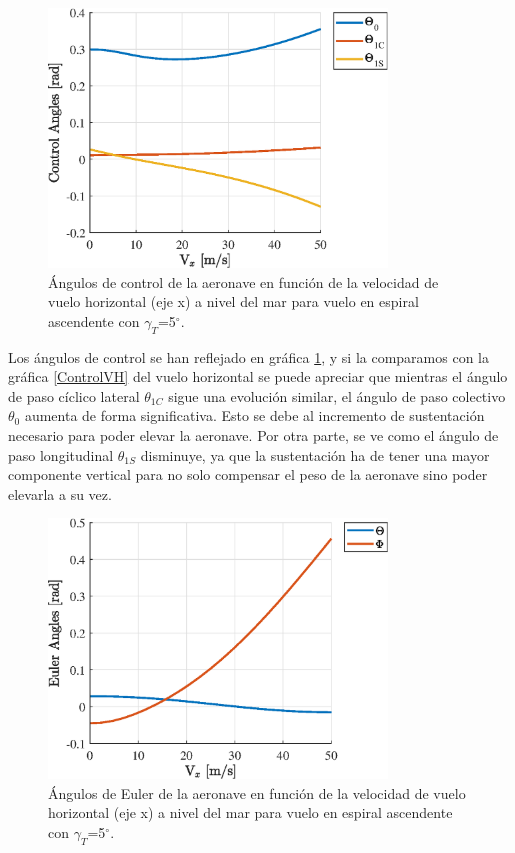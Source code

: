 \begin{figure}
	\centering
	\includegraphics[width=90mm]{graficos/ControlVE}
	\caption{Ángulos de control de la aeronave en función de la velocidad de vuelo horizontal (eje x) a nivel del mar para vuelo en espiral ascendente con $\gamma_T$=5$^\circ$.}
	\label{ControlVE}
\end{figure}

Los ángulos de control se han reflejado en gráfica \ref{ControlVE}, y si la comparamos con la gráfica \ref{ControlVH} del vuelo horizontal se puede apreciar que mientras el ángulo de paso cíclico lateral $\theta_{1C}$ sigue una evolución similar, el ángulo de paso colectivo $\theta_0$ aumenta de forma significativa. Esto se debe al incremento de sustentación necesario para poder elevar la aeronave. Por otra parte, se ve como el ángulo de paso longitudinal $\theta_{1S}$ disminuye, ya que la sustentación ha de tener una mayor componente vertical para no solo compensar el peso de la aeronave sino poder elevarla a su vez.

\begin{figure}
	\centering
	\includegraphics[width=90mm]{graficos/EulerVE}
	\caption{Ángulos de Euler de la aeronave en función de la velocidad de vuelo horizontal (eje x) a nivel del mar para vuelo en espiral ascendente con $\gamma_T$=5$^\circ$.}
	\label{EulerVE}
\end{figure}

